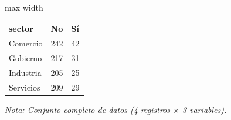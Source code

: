 

\begin{table}[htbp]

\centering

\begin{adjustbox}{max width=\textwidth}

\begin{tabular}{lll}

\rowcolor{ThemeBackground}
\rule{0pt}{0.45cm}
\textcolor{ThemeGold}{\bfseries sector} & \textcolor{ThemeGold}{\bfseries No} & \textcolor{ThemeGold}{\bfseries Sí} \\

Comercio & 242 & 42 \\
Gobierno & 217 & 31 \\
Industria & 205 & 25 \\
Servicios & 209 & 29 \\
\bottomrule
\end{tabular}

\end{adjustbox}

\vspace{0.15cm}
{\raggedright\sffamily\footnotesize\color{ThemeMuted}
\textit{Nota: Conjunto completo de datos (4 registros $\times$ 3 variables).}}

\end{table}
